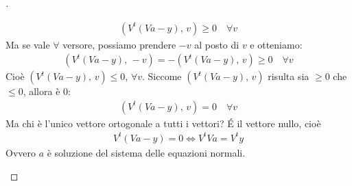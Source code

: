 \documentclass[12pt,a4paper]{article}
\begin{document}
\begin{proof}[\unskip\nopunct]
\begin{itemize}
\[ \begin{split}
	(V^t(Va-y), \, v) \geq 0 \quad \forall v
\end{split} \]
Ma se vale $\forall$ versore, possiamo prendere $-v$ al posto di $v$ e otteniamo:
\[ \begin{split}
	(V^t(Va-y), \, -v)=-(V^t(Va-y), \, v) \geq 0 \quad \forall v
\end{split} \]
Cioè $(V^t(Va-y), \, v) \leq 0$, $\forall v$. Siccome $(V^t(Va-y), \, v)$ risulta sia $\geq 0$ che $\leq 0$, allora è $0$:
\[ \begin{split}
	(V^t(Va-y), \, v)=0 \quad \forall v
\end{split} \]
Ma chi è l'unico vettore ortogonale a tutti i vettori? \'E il vettore nullo, cioè
\[ \begin{split}
	V^t(Va-y)=0 \iff V^tVa=V^ty
\end{split} \]
Ovvero $a$ è soluzione del sistema delle equazioni normali.
\end{itemize}
\end{proof}
\end{document}
